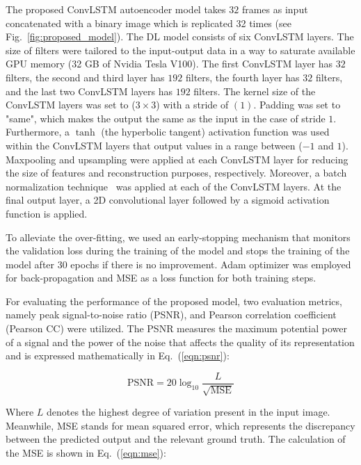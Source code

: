 The proposed ConvLSTM autoencoder model takes \(32\) frames as input concatenated with a binary image which is replicated 32 times (see Fig.~\ref{fig:proposed_model}). 
The DL model consists of six ConvLSTM layers.
The size of filters were tailored to the input-output data in a way to saturate available GPU memory (32 GB of Nvidia Tesla V100).
The first ConvLSTM layer has \(32\) filters, the second and third layer has \(192\) filters, the fourth layer has \(32\) filters, and the last two ConvLSTM layers has \(192\) filters.
The kernel size of the ConvLSTM layers was set to (\(3\times3\)) with a stride of \((1)\). 
Padding was set to "same", which makes the output the same as the input in the case of stride \(1\).
Furthermore, a \(\tanh\) (the hyperbolic tangent) activation function was used within the ConvLSTM layers that output values in a range between (\(-1\) and \(1\)).
Maxpooling and upsampling were applied at each ConvLSTM layer for reducing the size of features and reconstruction purposes, respectively. 
Moreover, a batch normalization technique~\cite{Santurkar2018} was applied at each of the ConvLSTM layers.
At the final output layer, a 2D convolutional layer followed by a sigmoid activation function is applied.

To alleviate the over-fitting, we used an early-stopping mechanism that monitors the validation loss during the training of the model and stops the training of the model after 30 epochs if there is no improvement. 
Adam optimizer was employed for back-propagation and MSE as a loss function for both training steps.

For evaluating the performance of the proposed model, two evaluation metrics, namely peak signal-to-noise ratio (PSNR), and Pearson correlation coefficient (Pearson CC) were utilized. 
The PSNR measures the maximum potential power of a signal and the power of the noise that affects the quality of its representation and is expressed mathematically in Eq.~(\ref{eqn:psnr}):

\begin{equation}
	\mathrm{PSNR}=20 \log _{10} \frac{L}{\sqrt{\mathrm{MSE}}}
	\label{eqn:psnr}
\end{equation}

Where \(L\) denotes the highest degree of variation present in the input image. 
Meanwhile, MSE stands for mean squared error, which represents the discrepancy 
between the predicted output and the relevant ground truth. The calculation of 
the MSE is shown in Eq.~(\ref{eqn:mse}): 

